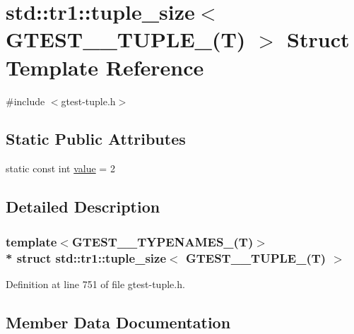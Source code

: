 \hypertarget{structstd_1_1tr1_1_1tuple__size_3_01_g_t_e_s_t__2___t_u_p_l_e___07_t_08_01_4}{}\section{std\+:\+:tr1\+:\+:tuple\+\_\+size$<$ G\+T\+E\+S\+T\+\_\+\_\+\+T\+U\+P\+L\+E\+\_\+(T) $>$ Struct Template Reference}
\label{structstd_1_1tr1_1_1tuple__size_3_01_g_t_e_s_t__2___t_u_p_l_e___07_t_08_01_4}


{\ttfamily \#include $<$gtest-\/tuple.\+h$>$}

\subsection*{Static Public Attributes}
\begin{DoxyCompactItemize}
\item 
static const int \hyperlink{structstd_1_1tr1_1_1tuple__size_3_01_g_t_e_s_t__2___t_u_p_l_e___07_t_08_01_4_a18545d733fa1f811712aa1153d8ba5d9}{value} = 2
\end{DoxyCompactItemize}


\subsection{Detailed Description}
\subsubsection*{template$<$G\+T\+E\+S\+T\+\_\+\_\+\+T\+Y\+P\+E\+N\+A\+M\+E\+S\+\_\+(\+T)$>$\\*
struct std\+::tr1\+::tuple\+\_\+size$<$ G\+T\+E\+S\+T\+\_\+\_\+\+T\+U\+P\+L\+E\+\_\+(\+T) $>$}



Definition at line 751 of file gtest-\/tuple.\+h.



\subsection{Member Data Documentation}
